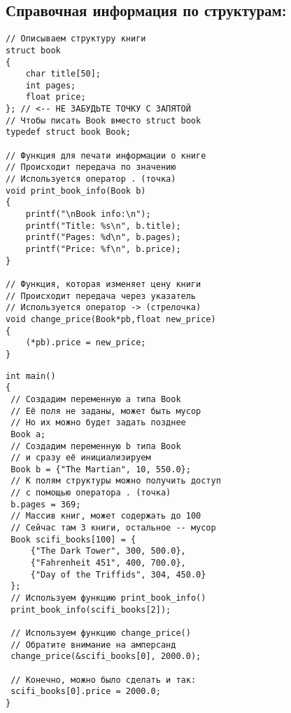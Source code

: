 \documentclass{article}
\begin{document}
\subsection*{Справочная информация по структурам:}
\begin{multicols}{2}
\begin{lstlisting}
// Описываем структуру книги
struct book
{
    char title[50];
    int pages;
    float price;
}; // <-- НЕ ЗАБУДЬТЕ ТОЧКУ С ЗАПЯТОЙ
// Чтобы писать Book вместо struct book
typedef struct book Book;

// Функция для печати информации о книге
// Происходит передача по значению
// Используется оператор . (точка)
void print_book_info(Book b)
{
    printf("\nBook info:\n");
    printf("Title: %s\n", b.title);
    printf("Pages: %d\n", b.pages);
    printf("Price: %f\n", b.price);
}

// Функция, которая изменяет цену книги
// Происходит передача через указатель
// Используется оператор -> (стрелочка)
void change_price(Book*pb,float new_price)
{
    (*pb).price = new_price;
}
\end{lstlisting}
\begin{lstlisting}
int main()
{
 // Создадим переменную a типа Book
 // Её поля не заданы, может быть мусор
 // Но их можно будет задать позднее
 Book a; 
 // Создадим переменную b типа Book
 // и сразу её инициализируем
 Book b = {"The Martian", 10, 550.0};
 // К полям структуры можно получить доступ
 // с помощью оператора . (точка)
 b.pages = 369;
 // Массив книг, может содержать до 100
 // Сейчас там 3 книги, остальное -- мусор
 Book scifi_books[100] = {
     {"The Dark Tower", 300, 500.0},
     {"Fahrenheit 451", 400, 700.0},
     {"Day of the Triffids", 304, 450.0}
 };
 // Используем функцию print_book_info()
 print_book_info(scifi_books[2]);
        
 // Используем функцию change_price()
 // Обратите внимание на амперсанд
 change_price(&scifi_books[0], 2000.0);
    
 // Конечно, можно было сделать и так:
 scifi_books[0].price = 2000.0;
}
\end{lstlisting}
\end{multicols}
\end{document}
